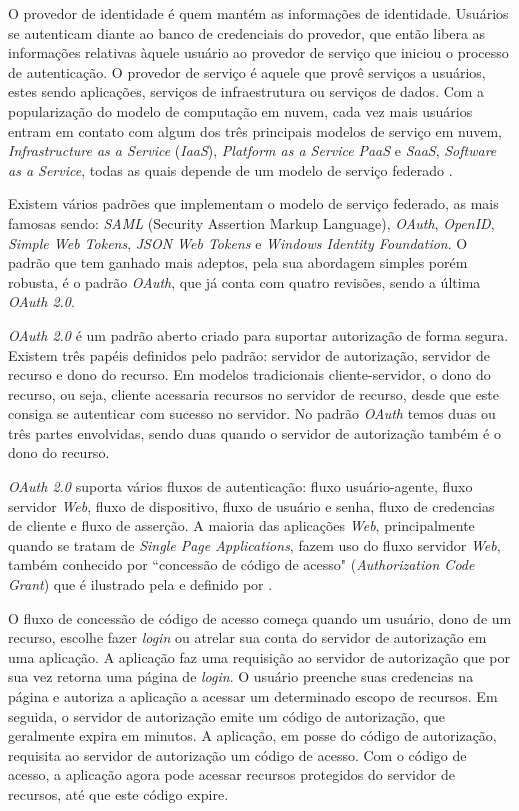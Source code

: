   O provedor de identidade é quem mantém as informações de identidade. Usuários 
  se autenticam diante ao banco de credenciais do provedor, que então libera as
  informações relativas àquele usuário ao provedor de serviço que iniciou o processo 
  de autenticação. O provedor de serviço é aquele que provê serviços a usuários, 
  estes sendo aplicações, serviços de infraestrutura ou serviços de dados. Com a popularização 
  do modelo de computação em nuvem, cada vez mais usuários entram em contato com algum dos três 
  principais modelos de serviço em nuvem,  \emph{Infrastructure as a Service} (\emph{IaaS}), 
  \emph{Platform as a Service} \emph{PaaS} e \emph{SaaS}, \emph{Software as a Service}, 
  todas as quais depende de um modelo de serviço federado \cite{rountree2012federated}.

  Existem vários padrões que implementam o modelo de serviço federado, as mais famosas sendo:
  \emph{SAML} (Security Assertion Markup Language), \emph{OAuth}, \emph{OpenID}, 
  \emph{Simple Web Tokens}, \emph{JSON Web Tokens} e \emph{Windows Identity Foundation}. O 
  padrão que tem ganhado mais adeptos, pela sua abordagem simples porém robusta,
  é o padrão \emph{OAuth}, que já conta com quatro revisões, sendo a última
  \emph{OAuth 2.0}. 

  \emph{OAuth 2.0} é um padrão aberto criado para suportar autorização de forma segura. 
  Existem três papéis definidos pelo padrão: servidor de autorização, servidor de recurso e 
  dono do recurso. Em modelos tradicionais cliente-servidor, o dono do recurso, ou seja, cliente 
  acessaria recursos no servidor de recurso, desde que este consiga se autenticar com 
  sucesso no servidor. No padrão \emph{OAuth} temos duas ou três partes envolvidas, 
  sendo duas quando o servidor de autorização também é o dono do recurso.

  \emph{OAuth 2.0} suporta vários fluxos de autenticação: fluxo usuário-agente, 
  fluxo servidor \emph{Web}, fluxo de dispositivo, fluxo de usuário e senha, fluxo 
  de credencias de cliente e fluxo de asserção. A maioria das aplicações \emph{Web}, 
  principalmente quando se tratam de \emph{Single Page Applications},
  fazem uso do fluxo servidor \emph{Web}, também 
  conhecido por ``concessão de código de acesso" (\emph{Authorization Code Grant})
  que é ilustrado pela  e definido por . 

  O fluxo de concessão de código de acesso começa quando um usuário, dono de um recurso, escolhe 
  fazer \emph{login} ou atrelar sua conta do servidor de autorização em uma aplicação. A aplicação 
  faz uma requisição ao servidor de autorização que por sua vez retorna uma página de \emph{login}. 
  O usuário preenche suas credencias na página e autoriza a aplicação a acessar um determinado 
  escopo de recursos. Em seguida, o servidor de autorização emite um código de autorização, 
  que geralmente expira em minutos. A aplicação, em posse do código de autorização, requisita 
  ao servidor de autorização um código de acesso. Com o código de acesso, a aplicação agora 
  pode acessar recursos protegidos do servidor de recursos, até que este código expire.

